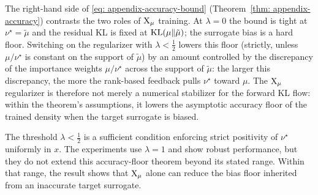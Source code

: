 \documentclass{article}
\begin{document}
The right-hand side of \eqref{eq: appendix-accuracy-bound} (Theorem~\ref{thm: appendix-accuracy}) contrasts the two roles of $\mathrm{X}_\mu$ training. At $\lambda = 0$ the bound is tight at $\nu^\star = \tilde\mu$ and the residual KL is fixed at $\mathrm{KL}(\mu\|\tilde\mu)$; the surrogate bias is a hard floor. Switching on the regularizer with $\lambda < \frac12$ lowers this floor (strictly, unless $\mu/\nu^\star$ is constant on the support of $\tilde\mu$) by an amount controlled by the discrepancy of the importance weights $\mu/\nu^\star$ across the support of $\tilde\mu$: the larger this discrepancy, the more the rank-based feedback pulls $\nu^\star$ toward $\mu$. The $\mathrm{X}_\mu$ regularizer is therefore not merely a numerical stabilizer for the forward KL flow: within the theorem's assumptions, it lowers the asymptotic accuracy floor of the trained density when the target surrogate is biased.

The threshold $\lambda < \frac12$ is a sufficient condition enforcing strict positivity of $\nu^\star$ uniformly in $x$. The experiments use $\lambda=1$ and show robust performance, but they do not extend this accuracy-floor theorem beyond its stated range. Within that range, the result shows that $\mathrm{X}_\mu$ alone can reduce the bias floor inherited from an inaccurate target surrogate.



\end{document}
